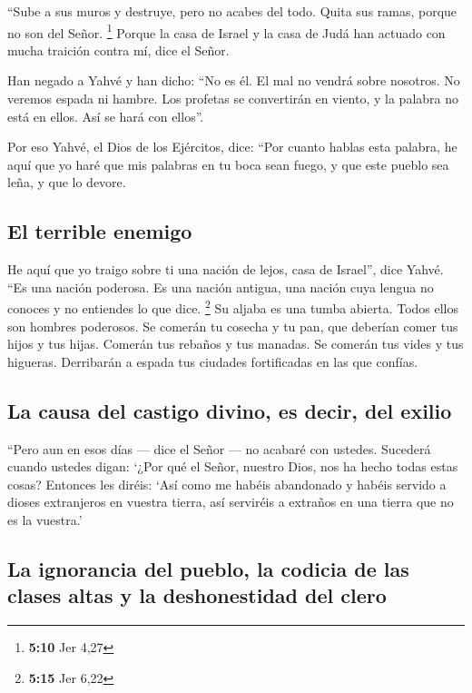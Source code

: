  ``Sube a sus muros y destruye, pero no acabes del todo.
Quita sus ramas, porque no son del Señor. \footnote{\textbf{5:10} Jer
  4,27}  Porque la casa de Israel y la casa de Judá han
actuado con mucha traición contra mí, dice el Señor.

 Han negado a Yahvé y han dicho: ``No es él. El mal no
vendrá sobre nosotros. No veremos espada ni hambre.  Los
profetas se convertirán en viento, y la palabra no está en ellos. Así se
hará con ellos''.

 Por eso Yahvé, el Dios de los Ejércitos, dice: ``Por
cuanto hablas esta palabra, he aquí que yo haré que mis palabras en tu
boca sean fuego, y que este pueblo sea leña, y que lo devore.

\hypertarget{el-terrible-enemigo}{%
\subsection{El terrible enemigo}\label{el-terrible-enemigo}}

 He aquí que yo traigo sobre ti una nación de lejos, casa
de Israel'', dice Yahvé. ``Es una nación poderosa. Es una nación
antigua, una nación cuya lengua no conoces y no entiendes lo que dice.
\footnote{\textbf{5:15} Jer 6,22}  Su aljaba es una tumba
abierta. Todos ellos son hombres poderosos.  Se comerán
tu cosecha y tu pan, que deberían comer tus hijos y tus hijas. Comerán
tus rebaños y tus manadas. Se comerán tus vides y tus higueras.
Derribarán a espada tus ciudades fortificadas en las que confías.

\hypertarget{la-causa-del-castigo-divino-es-decir-del-exilio}{%
\subsection{La causa del castigo divino, es decir, del
exilio}\label{la-causa-del-castigo-divino-es-decir-del-exilio}}

 ``Pero aun en esos días --- dice el Señor --- no acabaré
con ustedes.  Sucederá cuando ustedes digan: `¿Por qué el
Señor, nuestro Dios, nos ha hecho todas estas cosas? Entonces les
diréis: `Así como me habéis abandonado y habéis servido a dioses
extranjeros en vuestra tierra, así serviréis a extraños en una tierra
que no es la vuestra.'

\hypertarget{la-ignorancia-del-pueblo-la-codicia-de-las-clases-altas-y-la-deshonestidad-del-clero}{%
\subsection{La ignorancia del pueblo, la codicia de las clases altas y
la deshonestidad del
clero}\label{la-ignorancia-del-pueblo-la-codicia-de-las-clases-altas-y-la-deshonestidad-del-clero}}

